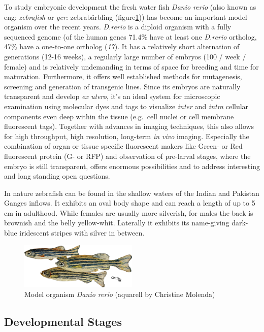 \documentclass[11pt,singlespacinge,twoside]{reedthesis} %
\begin{document}
To study embryonic development the fresh water fish \emph{Danio rerio} (also known as eng: \emph{zebrafish} or \emph{ger:} zebrabärbling (figure\ref{fig:zebra})) has become an important model organism over the recent years. \emph{D.rerio} is a diploid organism with a fully sequenced genome (of the human genes 71.4\% have at least one \emph{D.rerio} ortholog, 47\% have a one-to-one ortholog (\emph{17}). It has a relatively short alternation of generations (12-16 weeks), a regularly large number of embryos (100 / week / female) and is relatively undemanding in terms of space for breeding and time for maturation. Furthermore, it offers well established methods for mutagenesis, screening and generation of transgenic lines. Since its embryos are naturally transparent and develop \emph{ex utero}, it's an ideal system for microscopic examination using molecular dyes and tags to visualize \emph{inter} and \emph{intra} cellular components even deep within the tissue (e.g.~cell nuclei or cell membrane fluorescent tags). Together with advances in imaging techniques, this also allows for high throughput, high resolution, long-term \emph{in vivo} imaging. Especially the combination of organ or tissue specific fluorescent makers like Green- or Red fluorescent protein (G- or RFP) and observation of pre-larval stages, where the embryo is still transparent, offers enormous possibilities and to address interesting and long standing open questions.

In nature zebrafish can be found in the shallow waters of the Indian and Pakistan Ganges inflows. It exhibits an oval body shape and can reach a length of up to 5 cm in adulthood. While females are usually more silverish, for males the back is brownish and the belly yellow-whit. Laterally it exhibits its name-giving dark-blue iridescent stripes with silver in between.


\begin{figure}

{\centering \includegraphics[width=0.50\textwidth]{figures/intro/CM_fish} 

}

\caption[Model organism Danio rerio]{Model organism \emph{Danio rerio} (aquarell by Christine Molenda)}\label{fig:zebra}
\end{figure}
\hypertarget{developmental-stages}{%
\subsection{Developmental Stages}\label{developmental-stages}}
\end{document}
